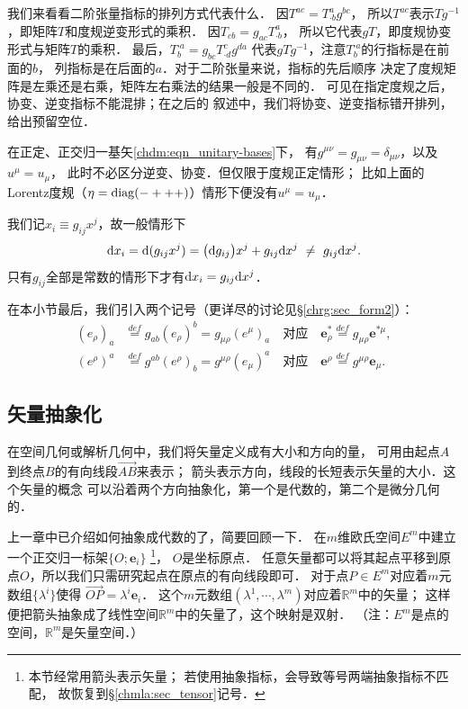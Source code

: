我们来看看二阶张量指标的排列方式代表什么．
因$T^{ac}=T^{a}_{\cdot b}g^{bc}$，
所以$T^{ac}$表示$Tg^{-1}$，即矩阵$T$和度规逆变形式的乘积．
因$T_{cb}=g_{ac}T^{a}_{\cdot b}$，
所以它代表$g T$，即度规协变形式与矩阵$T$的乘积．
最后，$T^{\cdot a}_{b}=g_{bc}T^{c}_{\cdot d}g^{da}$
代表$g T g^{-1}$，注意$T^{\cdot a}_{b}$的行指标是在前面的$b$，
列指标是在后面的$a$．对于二阶张量来说，指标的先后顺序
决定了度规矩阵是左乘还是右乘，矩阵左右乘法的结果一般是不同的．
可见在指定度规之后，协变、逆变指标不能混排；在之后的
叙述中，我们将协变、逆变指标错开排列，给出预留空位．

在{\kaishu 正定、正交归一}基矢\eqref{chdm:eqn_unitary-bases}下，
有$g^{\mu\nu}=g_{\mu\nu}=\delta_{\mu\nu}$，以及$u^\mu = u_\mu$，
此时不必区分逆变、协变．但仅限于度规正定情形；
比如上面的Lorentz度规（$\eta={\rm diag}(-+++)$）情形下便没有$u^\mu = u_\mu$．

我们记$x_i \equiv g_{ij}x^j$，故一般情形下
\begin{align}
	{\rm d}x_i = {\rm d}(g_{ij}x^j) = \bigl({\rm d}g_{ij}\bigr)x^j+ g_{ij}{\rm d}x^j
	\  \neq \ g_{ij}{\rm d}x^j.
\end{align}
只有$g_{ij}$全部是常数的情形下才有${\rm d}x_i =g_{ij}{\rm d}x^j$．

在本小节最后，我们引入两个记号（更详尽的讨论见\S\ref{chrg:sec_form2}）：
\begin{align}
	(e_\rho)_a &\overset{def}{=} g_{ab}(e_\rho)^b 
	= g_{\mu\rho}(e^\mu)_a
	\quad \text{对应}\quad 
	\boldsymbol{e}_\rho ^* \overset{def}{=} g_{\mu\rho} \boldsymbol{e}^{*\mu}, \\
	(e^\rho)^a &\overset{def}{=} g^{ab}(e^\rho)_b 
	= g^{\mu\rho}(e_\mu)^a 
	\quad \text{对应}\quad 
	\boldsymbol{e}^\rho \overset{def}{=} g^{\mu\rho} \boldsymbol{e}_{\mu} .
\end{align}


\subsection{矢量抽象化}\label{chdm:sec_vector-abstract2geo}
在空间几何或解析几何中，我们将矢量定义成有大小和方向的量，
可用由起点$A$到终点$B$的有向线段$\overrightarrow{AB}$来表示；
箭头表示方向，线段的长短表示矢量的大小．这个矢量的概念
可以沿着两个方向{\kaishu 抽象化}，第一个是代数的，第二个是微分几何的．

上一章中已介绍如何抽象成代数的了，简要回顾一下．
在$m$维欧氏空间$E^m$中建立一个正交归一标架$\{O;\boldsymbol{e}_i\}$
{\footnote{本节经常用箭头表示矢量；
        若使用抽象指标，会导致等号两端抽象指标不匹配，
    故恢复到\S\ref{chmla:sec_tensor}记号．}}，
$O$是坐标原点．
任意矢量都可以将其起点平移到原点$O$，所以我们只需研究起点在原点的有向线段即可．
对于点$P \in E^m$对应着$m$元数组$\{\lambda^i\}$使得
$    \overrightarrow{OP} = \lambda^i \boldsymbol{e}_i $．
这个$m$元数组$(\lambda^1,\cdots,\lambda^m)$对应着$\mathbb{R}^m$中的矢量；
这样便把箭头抽象成了线性空间$\mathbb{R}^m$中的矢量了，这个映射是双射．
（注：$E^m$是{\kaishu 点}的空间，$\mathbb{R}^m$是{\kaishu 矢量}空间．）

